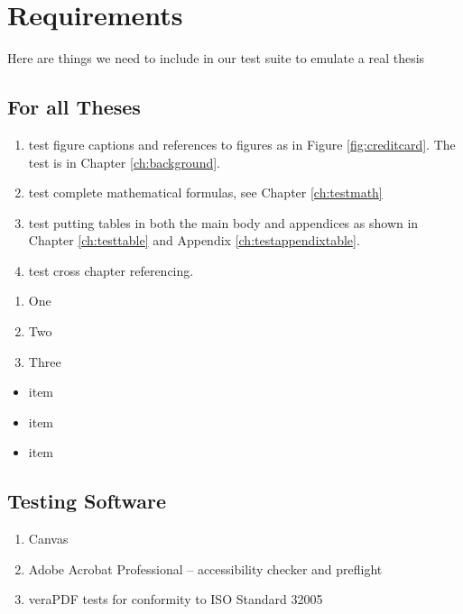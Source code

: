 
\chapter{Requirements}\label{ch:requirements}

Here are things we need to include in our test suite to emulate a real thesis

\section{For all Theses}\label{sec:rec_all_theses}
\begin{enumerate}%
\item test figure captions and references to figures as in Figure \ref{fig:creditcard}. The test is in Chapter \ref{ch:background}.
\item test complete mathematical formulas, see Chapter \ref{ch:testmath}
\item test putting tables in both the main body and appendices as shown in Chapter \ref{ch:testtable} and Appendix \ref{ch:testappendixtable}.
\item test cross chapter referencing.
\end{enumerate}

\begin{enumerate}
\item One
\item Two
\item Three
\end{enumerate}

\begin{itemize}
\item item
\item item
\item item
\end{itemize}

\section{Testing Software}\label{sec:req_testing}

\begin{enumerate}
    \item Canvas
    \item Adobe Acrobat Professional -- accessibility checker and preflight
    \item veraPDF tests for conformity to ISO Standard 32005
\end{enumerate}